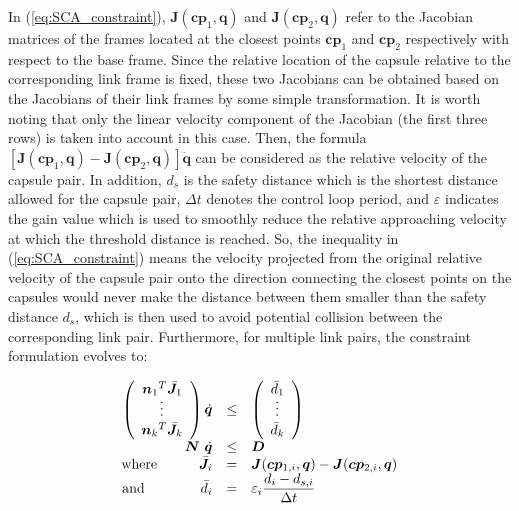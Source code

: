  In (\ref{eq:SCA_constraint}), $ \bm{J}(\bm{cp}_1,\bm{q}) $ and $ \bm{J}(\bm{cp}_2,\bm{q}) $ refer to the Jacobian matrices of the frames located at the closest points $ \bm{cp}_1 $ and $ \bm{cp}_2 $ respectively with respect to the base frame. Since the relative location of the capsule relative to the corresponding link frame is fixed, these two Jacobians can be obtained based on the Jacobians of their link frames by some simple transformation. It is worth noting that only the linear velocity component of the Jacobian (the first three rows) is taken into account in this case. Then, the formula $ [\bm{J}(\bm{cp}_1,\bm{q})-\bm{J}(\bm{cp}_2,\bm{q})]\dot{\bm{q}} $ can be considered as the relative velocity of the capsule pair. In addition, $ d_s $ is the safety distance which is the shortest distance allowed for the capsule pair, $ \Delta t $ denotes the control loop period, and $ \varepsilon $ indicates the gain value which is used to smoothly reduce the relative approaching velocity at which the threshold distance is reached. So, the inequality in (\ref{eq:SCA_constraint}) means the velocity projected from the original relative velocity of the capsule pair onto the direction connecting the closest points on the capsules would never make the distance between them smaller than the safety distance $ d_s $, which is then used to avoid potential collision between the corresponding link pair. Furthermore, for multiple link pairs, the constraint formulation evolves to:


\vspace{-2mm}
    \begin{equation} 
        \label{eq:SCA_constraint_matrix}
        \begin{array}{rcl}
            \left( \begin{array}{c}
                {\bm{n}_1}^{T}\bar{\bm{J}_1}  \\
                \rotatebox{90}{$\cdots$}  \\
                {\bm{n}_k}^{T}\bar{\bm{J}_k}  \end{array} \right) \dot{\bm{q}} &  \leq  &
            \left( \begin{array}{c}
            \bar{d}_1  \\
\rotatebox{90}{$\cdots$}  \\
\bar{d}_k  \end{array} \right) \\

\bm{N} \ \dot{\bm{q}} &  \leq  & \bm{D} \\

\text{where} \ \ \ \ \ \ \ \ \ \bar{\bm{J}_i} & = & \bm{J}(\bm{cp}_{1,i},\bm{q})-\bm{J}(\bm{cp}_{2,i},\bm{q}) \\

\text{and} \ \ \ \ \ \ \ \ \ \ \ \ \bar{d_i} & = & \varepsilon_i \dfrac{d_i - d_{s,i}}{\Delta t}
\end{array}
\end{equation}

